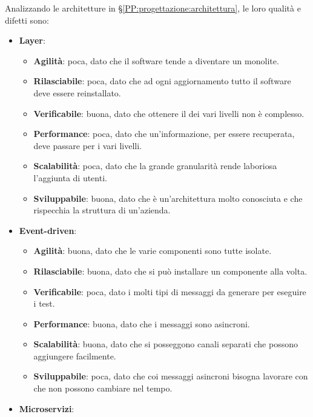         Analizzando le architetture in \S\ref{PP:progettazione:architettura}, le loro qualità e difetti sono:
        \begin{itemize}
            \item \textbf{Layer}:
                \begin{itemize}
                    \item \textbf{Agilità}: poca, dato che il software tende a diventare un monolite.
                    \item \textbf{Rilasciabile}: poca, dato che ad ogni aggiornamento tutto il software deve essere reinstallato.
                    \item \textbf{Verificabile}: buona, dato che ottenere il  dei vari livelli non è complesso.
                    \item \textbf{Performance}: poca, dato che un'informazione, per essere recuperata, deve passare per i vari livelli.
                    \item \textbf{Scalabilità}: poca, dato che la grande granularità rende laboriosa l'aggiunta di utenti.
                    \item \textbf{Sviluppabile}: buona, dato che è un'architettura molto conosciuta e che rispecchia la struttura di un'azienda.
                \end{itemize}
            \item \textbf{Event-driven}:
                \begin{itemize}
                    \item \textbf{Agilità}: buona, dato che le varie componenti sono tutte isolate.
                    \item \textbf{Rilasciabile}: buona, dato che si può installare un componente alla volta.
                    \item \textbf{Verificabile}: poca, dato i molti tipi di messaggi da generare per eseguire i test.
                    \item \textbf{Performance}: buona, dato che i messaggi sono asincroni.
                    \item \textbf{Scalabilità}: buona, dato che si posseggono canali separati che possono aggiungere facilmente.
                    \item \textbf{Sviluppabile}: poca, dato che coi messaggi asincroni bisogna lavorare con  che non possono cambiare nel tempo.
                \end{itemize}
            \item \textbf{Microservizi}:

\end{itemize}
